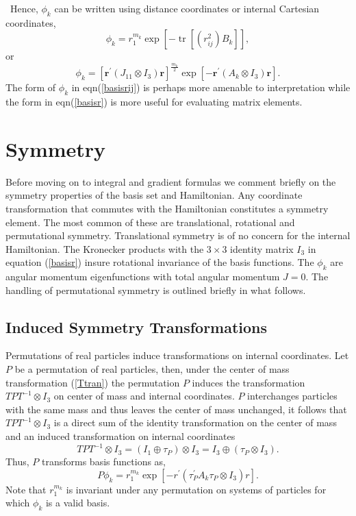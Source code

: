 \documentclass[12pt]{article}
\begin{document}
\ Hence, $\phi_{k}$ can be written using distance coordinates or internal
Cartesian coordinates,
\begin{equation}
\phi_{k}=r_{1}^{m_{k}}\exp\left[  -\operatorname{tr}\left[  \left(  r_{ij}%
^{2}\right)  B_{k}\right]  \right]  ,\label{basisrij}%
\end{equation}
or
\begin{equation}
\phi_{k}=\left[  \mathbf{r}^{\prime}(J_{11}\otimes I_{3})\mathbf{r}\right]
^{\frac{m_{k}}{2}}\exp\left[  -\mathbf{r}^{\prime}(A_{k}\otimes I_{3}%
)\mathbf{r}\right]  .\label{basisr}%
\end{equation}
The form of $\phi_{k}$ in eqn(\ref{basisrij}) is perhaps more amenable to
interpretation while the form in eqn(\ref{basisr}) is more useful for
evaluating matrix elements.

\section{Symmetry}

Before moving on to integral and gradient formulas we comment briefly on the
symmetry properties of the basis set and Hamiltonian. Any coordinate
transformation that commutes with the Hamiltonian constitutes a symmetry
element. The most common of these are translational, rotational and
permutational symmetry. Translational symmetry is of no concern for the
internal Hamiltonian. The Kronecker products with the $3\times3$ identity
matrix $I_{3}$ in equation (\ref{basisr}) insure rotational invariance of the
basis functions. The $\phi_{k}$ are angular momentum eigenfunctions with total
angular momentum $J=0$. The handling of permutational symmetry is outlined
briefly in what follows.

\subsection{\bigskip Induced Symmetry Transformations}

Permutations of real particles induce transformations on internal coordinates.
Let $P$ be a permutation of real particles, then, under the center of mass
transformation (\ref{Ttran}) the permutation $P$ induces the transformation
$TPT^{-1}\otimes I_{3}$ on center of mass and internal coordinates. $P$
interchanges particles with the same mass and thus leaves the center of mass
unchanged, it follows that $TPT^{-1}\otimes I_{3}$ is a direct sum of the
identity transformation on the center of mass and an induced transformation on
internal coordinates
\begin{equation}
TPT^{-1}\otimes I_{3}=\left(  I_{1}\oplus\tau_{P}\right)  \otimes I_{3}%
=I_{3}\oplus\left(  \tau_{P}\otimes I_{3}\right)  .\label{TPT}%
\end{equation}
Thus, $P$ transforms basis functions as,
\begin{equation}
P\phi_{k}=r_{1}^{m_{k}}\exp\left[  -r^{\prime}\left(  \tau_{P}^{\prime}%
A_{k}\tau_{P}\otimes I_{3}\right)  r\right]  .
\end{equation}
Note that $r_{1}^{m_{k}}$ is invariant under any permutation on systems of
particles for which $\phi_{k}$ is a valid basis.
\end{document}
